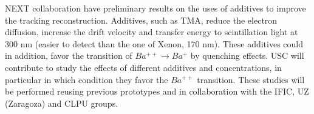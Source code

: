 NEXT collaboration have preliminary results on the uses of additives to improve the tracking reconstruction. Additives, such as TMA, reduce the electron diffusion, increase the drift velocity and transfer energy to scintillation light at 300 nm (easier to detect than the one of Xenon, 170 nm). These additives could in addition, favor the transition of $Ba^{++}\to Ba^+$ by quenching effects. USC will contribute to study the effects of different additives and concentrations, in particular in which condition they favor the $Ba^{++}$ transition.
These studies will be performed reusing previous prototypes and in collaboration with the IFIC, UZ (Zaragoza) and CLPU groups.

 


